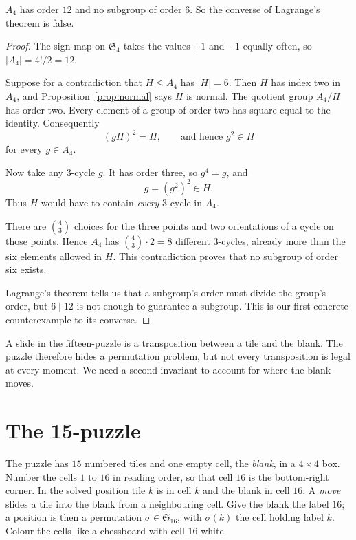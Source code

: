\begin{proposition}\label{prop:a4}
$A_4$ has order $12$ and no subgroup of order $6$. So the converse of Lagrange's theorem is false.
\end{proposition}
\begin{proof}
The sign map on $\mathfrak S_4$ takes the
values $+1$ and $-1$ equally often, so
$|A_4|=4!/2=12$.

Suppose for a contradiction that $H\le A_4$
has $|H|=6$. Then $H$ has index two in
$A_4$, and Proposition~\ref{prop:normal}
says $H$ is normal. The quotient group
$A_4/H$ has order two. Every element
of a group of order two has square
equal to the identity. Consequently
\[
(gH)^2=H,\qquad\text{and hence }g^2\in H
\]
for every $g\in A_4$.

Now take any $3$-cycle $g$. It has order
three, so $g^4=g$, and
\[
g=(g^2)^2\in H.
\]
Thus $H$ would have to contain \emph{every}
$3$-cycle in $A_4$.

There are $\binom43$ choices for the three
points and two orientations of a cycle on
those points. Hence $A_4$ has
$\binom43\cdot2=8$ different $3$-cycles,
already more than the six elements allowed
in $H$. This contradiction proves that
no subgroup of order six exists.

Lagrange's theorem tells us that a subgroup's
order must divide the group's order, but
$6\mid12$ is not enough to guarantee
a subgroup. This is our first concrete
counterexample to its converse.
\end{proof}

A slide in the fifteen-puzzle is a transposition between a tile and the blank. The puzzle therefore hides a permutation problem, but not every transposition is legal at every moment. We need a second invariant to account for where the blank moves.

\section{The 15-puzzle}

The puzzle has $15$ numbered tiles and one empty cell, the \emph{blank}, in a $4\times4$ box. Number the cells $1$ to $16$ in reading order, so that cell $16$ is the bottom-right corner. In the solved position tile $k$ is in cell $k$ and the blank in cell $16$. A \emph{move} slides a tile into the blank from a neighbouring cell. Give the blank the label $16$; a position is then a permutation $\sigma\in\mathfrak S_{16}$, with $\sigma(k)$ the cell holding label $k$. Colour the cells like a chessboard with cell $16$ white.

